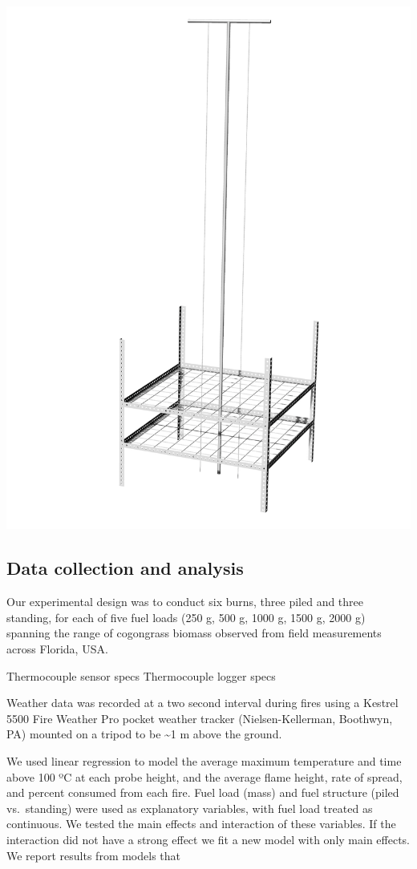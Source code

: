 \documentclass[11pt,a4paper]{article}
\begin{document}
\includegraphics{figures/FABIOdraft.jpg}

\hypertarget{data-collection-and-analysis}{%
\subsection{Data collection and
analysis}\label{data-collection-and-analysis}}

Our experimental design was to conduct six burns, three piled and three
standing, for each of five fuel loads (250 g, 500 g, 1000 g, 1500 g,
2000 g) spanning the range of cogongrass biomass observed from field
measurements across Florida, USA.

Thermocouple sensor specs Thermocouple logger specs

Weather data was recorded at a two second interval during fires using a
Kestrel 5500 Fire Weather Pro pocket weather tracker (Nielsen-Kellerman,
Boothwyn, PA) mounted on a tripod to be \textasciitilde{}1 m above the
ground.

We used linear regression to model the average maximum temperature and
time above 100 ºC at each probe height, and the average flame height,
rate of spread, and percent consumed from each fire. Fuel load (mass)
and fuel structure (piled vs.~standing) were used as explanatory
variables, with fuel load treated as continuous. We tested the main
effects and interaction of these variables. If the interaction did not
have a strong effect we fit a new model with only main effects. We
report results from models that
\end{document}
